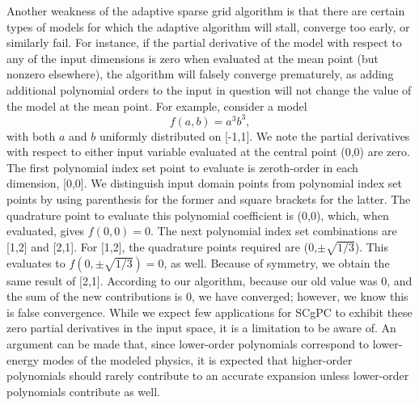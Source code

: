 Another weakness of the adaptive sparse grid algorithm is that 
there are certain types of models for which the adaptive algorithm will stall, converge too early, or
similarly fail.  For instance, if the partial derivative of the model with respect to any of the
input dimensions is zero when evaluated at the mean point (but nonzero elsewhere), the algorithm will falsely
converge prematurely, as adding additional polynomial orders to the input in question will not change the
value of the model at the mean point.  For example, consider a model
\begin{equation}
  f(a,b) = a^3b^3,
\end{equation}
with both $a$ and $b$ uniformly distributed on [-1,1].  We note the partial derivatives with respect to either
input variable evaluated at the central point (0,0) are zero.  The first polynomial index set point to
evaluate is zeroth-order in each dimension, [0,0].  We distinguish input domain points from polynomial index
set points by using parenthesis for the former and square brackets for the latter. The quadrature point to
evaluate this polynomial coefficient is (0,0), which, when evaluated, gives $f(0,0)=0$.  The next polynomial
index set combinations are [1,2] and [2,1].  For [1,2], the quadrature points required are
(0,$\pm\sqrt{1/3}$).  This evaluates to $f(0,\pm\sqrt{1/3})=0$, as well.  Because of symmetry, we obtain the
same result of [2,1].  According to our algorithm, because our old value was 0, and the sum of the new
contributions is 0, we have converged; however, we know this is false convergence.  While we expect few
applications for SCgPC to exhibit these zero partial derivatives in the input space, it is a limitation to be
aware of.  An argument can be made that, since lower-order polynomials correspond to lower-energy modes of the
modeled physics, it is expected that higher-order polynomials should rarely contribute to an accurate
expansion unless lower-order polynomials contribute as well.



